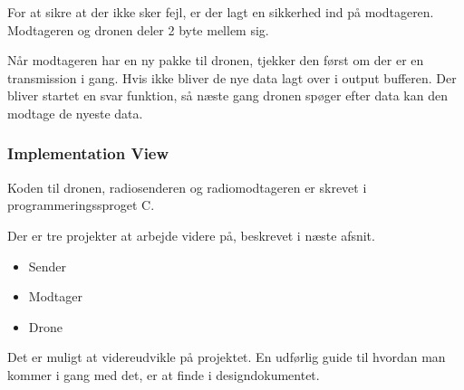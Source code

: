 \documentclass[Main]{subfiles}
\begin{document}
For at sikre at der ikke sker fejl, er der lagt en sikkerhed ind på modtageren. Modtageren og dronen deler 2 byte mellem sig.

Når modtageren har en ny pakke til dronen, tjekker den først om der er en \itoc transmission i gang. Hvis ikke bliver de nye data lagt over i output bufferen. Der bliver startet en svar funktion, så næste gang dronen spøger efter data kan den modtage de nyeste data.

\subsubsection*{Implementation View}
Koden til dronen, radiosenderen og radiomodtageren er skrevet i programmeringssproget C.

Der er tre projekter at arbejde videre på, beskrevet i næste afsnit.


\begin{itemize}
\item Sender
\item Modtager
\item Drone
\end{itemize}

Det er muligt at videreudvikle på projektet.
En udførlig guide til hvordan man kommer i gang med det, er at finde i  designdokumentet\cite[afs. 2.4]{Design}.
\end{document}
